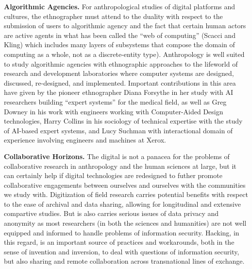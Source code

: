 \documentclass[10pt,letter,oneside]{scrartcl}
\begin{document}


{\bf Algorithmic Agencies.} For anthropological studies of digital platforms
and cultures, the ethnographer must attend to the duality with respect to the
submission of users to algorithmic agency and the fact that certain human
actors are active agents in what has been called the ``web of computing''
(Scacci and Kling) which includes many layers of subsystems that compose the
domain of computing as a whole, not as a discrete-entity type).  Anthropology
is well suited to study algorithmic agencies with ethnographic approaches to
the lifeworld of research and development laboratories where computer systems
are designed, discussed, re-designed, and implemented. Important contributions
in this area have given by the pioneer ethnographer Diana Forsythe in her study
with AI researchers building ``expert systems'' for the medical field, as well
as Greg Downey in his work with engineers working with Computer-Aided Design
technologies, Harry Collins in his sociology of technical expertise with the
study of AI-based expert systems, and Lucy Suchman with interactional domain of
experience involving engineers and machines at Xerox. 



{\bf Collaborative Horizons.} The digital is not a panacea for the problems of
collaborative research in anthropology and the human sciences at large, but it
can certainly help if digital technologies are redesigned to futher promote
collaborative engagements between ourselves and ourselves with the communities
we study with. Digitization of field research carries potential benefits with
respect to the ease of archival and data sharing, allowing for longitudinal and
extensive compartive studies. But is also carries serious issues of data
privacy and anonymity as most researchers (in both the sciences and humanities)
are not well equipped and informed to handle problems of information security.
Hacking, in this regard, is an important source of practices and workarounds,
both in the sense of invention and inversion, to deal with questions of
information security, but also sharing and remote collaboration across
transnational lines of exchange.
\end{document}
